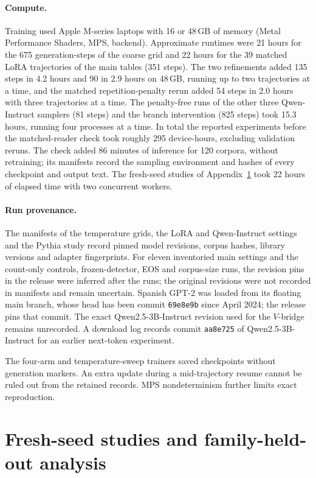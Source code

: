\documentclass[10pt]{article}
\theoremstyle{plain}
\theoremstyle{definition}
\begin{document}
\paragraph{Compute.} Training used Apple M-series laptops with 16 or 48\,GB of
memory (Metal Performance Shaders, MPS, backend). Approximate runtimes were 21 hours for the 675 generation-steps of the coarse
grid and 22 hours for the 39 matched LoRA trajectories of the main tables (351 steps). The two refinements added 135 steps
in 4.2 hours and 90 in 2.9 hours on 48\,GB, running up to two trajectories at a time, and the
matched repetition-penalty rerun added 54 steps in 2.0 hours with three trajectories at a time.
The penalty-free runs of the other three Qwen-Instruct samplers (81 steps) and the branch
intervention (825 steps) took 15.3 hours, running four processes at a time. In total the reported
experiments before the matched-reader check took roughly 295 device-hours, excluding validation reruns.
The check added 86 minutes of inference for 120 corpora, without retraining; its manifests record
the sampling environment and hashes of every checkpoint and output text. The fresh-seed studies of
Appendix~\ref{app:freshseeds} took 22 hours of elapsed time with two concurrent workers.

\paragraph{Run provenance.} The manifests of the temperature grids, the LoRA and Qwen-Instruct
settings and the Pythia study record pinned model revisions, corpus hashes, library versions
and adapter fingerprints. For eleven inventoried main settings and the count-only controls,
frozen-detector, EOS and corpus-size runs, the revision pins in the release were inferred after the runs; the original
revisions were not recorded in manifests and remain uncertain. Spanish GPT-2 was
loaded from its floating main branch, whose head has been commit \texttt{69e8e9b} since April
2024; the release pins that commit. The exact Qwen2.5-3B-Instruct revision used for the
$V$-bridge remains unrecorded. A download log records commit \texttt{aa8e725} of Qwen2.5-3B-Instruct for an
earlier next-token experiment.

The four-arm and temperature-sweep trainers saved checkpoints without generation markers.
An extra update during a mid-trajectory resume cannot be ruled out from the retained records.
MPS nondeterminism further limits exact reproduction.


\clearpage
\section{Fresh-seed studies and family-held-out analysis}
\label{app:freshseeds}
\end{document}
